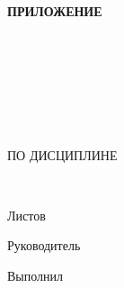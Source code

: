 \begin{ESKDtitlePage}
    \begin{flushright}
        \textbf{ПРИЛОЖЕНИЕ \envPrilLetter} \enspace\enspace
    \end{flushright}
    \begin{center}
        \envEducation \\
        \envUniversity \\
        \envCathedra \\
    \end{center}

    \vfill

    \begin{center}
        \textbf{\envTopic} \\
    \end{center}

    \vfill

    \begin{center}
        \envDocumentTopic \\
        ПО ДИСЦИПЛИНЕ \envDiscipline \\
    \end{center}

    \vfill

    \begin{center}
        \textbf{\envCode} \\
    \end{center}

    \begin{center}
        Листов \pageref{LastPage}
    \end{center}

    \vfill

    \begin{flushright}
        \begin{minipage}[t]{.49\textwidth}
            \begin{minipage}[t]{.75\textwidth}
                \begin{flushright}
                    Руководитель

                    \hspace{0pt}

                    Выполнил



                \end{flushright}
            \end{minipage}
        \end{minipage}
        \begin{minipage}[t]{.49\textwidth}
            \begin{flushright}
                \begin{minipage}[t]{.75\textwidth}
                    \envTeacherInitials~\envTeacherSurname


\end{minipage}
\end{flushright}
\end{minipage}
\end{flushright}
\end{ESKDtitlePage}
